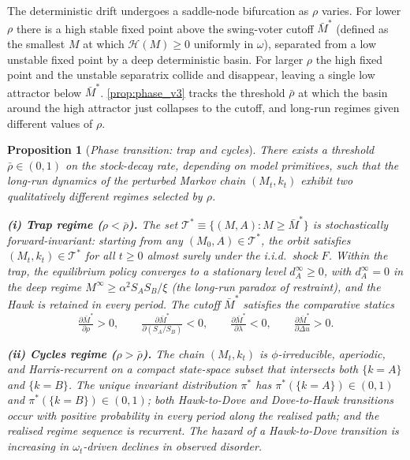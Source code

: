 \documentclass[11pt,twoside]{extarticle}
\newtheorem{proposition}{Proposition}
\begin{document}
The deterministic drift undergoes a saddle-node bifurcation as $\rho$ varies. For lower $\rho$ there is a high stable fixed point above the swing-voter cutoff $\bar M^*$ (defined as the smallest $M$ at which $\mathcal H(M)\ge 0$ uniformly in $\omega$), separated from a low unstable fixed point by a deep deterministic basin. For larger $\rho$ the high fixed point and the unstable separatrix collide and disappear, leaving a single low attractor below $\bar M^*$. 
\autoref{prop:phase_v3} tracks the threshold $\bar\rho$ at which the basin around the high attractor just collapses to the cutoff, and long-run regimes given different values of $\rho$.

\begin{proposition}[\emph{Phase transition: trap and cycles}]\label{prop:phase_v3}
There exists a threshold $\bar\rho\in(0,1)$ on the stock-decay rate, depending on model primitives, such that the long-run dynamics of the perturbed Markov chain $(M_t,k_t)$ exhibit two qualitatively different regimes selected by $\rho$.

\medskip
\noindent\textbf{(i) Trap regime ($\rho<\bar\rho$).} The set $\mathcal T^*\equiv\{(M,A):M\ge\bar M^*\}$ is stochastically forward-invariant: starting from any $(M_0,A)\in\mathcal T^*$, the orbit satisfies $(M_t,k_t)\in\mathcal T^*$ for all $t\ge 0$ almost surely under the i.i.d.\ shock $F$. Within the trap, the equilibrium policy converges to a stationary level $d_A^\infty\ge 0$, with $d_A^\infty=0$ in the deep regime $M^\infty\ge\alpha^2 S_A S_B/\xi$ (the long-run paradox of restraint), and the Hawk is retained in every period. The cutoff $\bar M^*$ satisfies the comparative statics
\begin{equation}\label{eq:cs_signs_v3}
    \tfrac{\partial\bar M^*}{\partial\rho}>0,\qquad\tfrac{\partial\bar M^*}{\partial(S_A/S_B)}<0,\qquad\tfrac{\partial\bar M^*}{\partial\lambda}<0,\qquad\tfrac{\partial\bar M^*}{\partial\Delta u}>0.
\end{equation}

\medskip
\noindent\textbf{(ii) Cycles regime ($\rho>\bar\rho$).} The chain $(M_t,k_t)$ is $\phi$-irreducible, aperiodic, and Harris-recurrent on a compact state-space subset that intersects both $\{k=A\}$ and $\{k=B\}$. The unique invariant distribution $\pi^*$ has $\pi^*(\{k=A\})\in(0,1)$ and $\pi^*(\{k=B\})\in(0,1)$; both Hawk-to-Dove and Dove-to-Hawk transitions occur with positive probability in every period along the realised path; and the realised regime sequence is recurrent. The hazard of a Hawk-to-Dove transition is increasing in $\omega_t$-driven declines in observed disorder.
\end{proposition}
\end{document}
